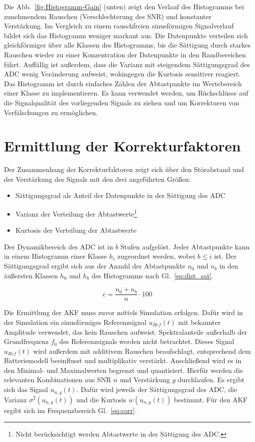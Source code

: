 Die Abb.~\ref{fig:Histogramm-Gain} (unten) zeigt den Verlauf des Histogramms bei zunehmendem Rauschen (Verschlechterung des SNR) und konstanter Verstärkung. Im Vergleich zu einem rauschfreien sinusförmigen Signalverlauf bildet sich das Histogramm weniger markant aus. Die Datenpunkte verteilen sich gleichförmiger über alle Klassen des Histogramms, bis die Sättigung durch starkes Rauschen wieder zu einer Konzentration der Datenpunkte in den Randbereichen führt. Auffällig ist außerdem, dass die Varianz mit steigendem Sättigungsgrad des ADC wenig Veränderung aufweist, wohingegen die Kurtosis sensitiver reagiert. Das Histogramm ist durch einfaches Zählen der Abtastpunkte im Wertebereich einer Klasse zu implementieren. Es kann verwendet werden, um Rückschlüsse auf die Signalqualität des vorliegenden Signals zu ziehen und um Korrekturen von Verfälschungen zu ermöglichen. 


\section{Ermittlung der Korrekturfaktoren}
Der Zusammenhang der Korrekturfaktoren zeigt sich über den Störabstand und der Verstärkung des Signals mit den drei angeführten Größen: 
\begin{itemize}
	\item Sättigungsgrad als Anteil der Datenpunkte in der Sättigung des ADC
	\item Varianz der Verteilung der Abtastwerte\footnote[1]{Nicht berücksichtigt werden Abtastwerte in der Sättigung des ADC.\label{foot:bereinigt}}
	\item Kurtosis der Verteilung der Abtastwerte
\end{itemize}
Der Dynamikbereich des ADC ist in $b$ Stufen aufgelöst. Jeder Abtastpunkte kann in einem Histogramm einer Klasse $h_i$ zugeordnet werden, wobei $b \leq i$ ist. Der Sättigungsgrad ergibt sich aus der Anzahl der Abtastpunkte $n_0$ und $n_b$ in den äußersten Klassen $h_0$ und $h_b$ des Histogramms nach Gl.~\eqref{eq:dist_sat}.

\begin{equation}
	\label{eq:dist_sat}
	c = \frac{n_0 + n_b}{n} \cdot 100
\end{equation}

Die Ermittlung der AKF muss zuvor mittels Simulation erfolgen. 
Dafür wird in der Simulation ein sinusförmiges Referenzsignal $u_{Ref}(t)$ mit bekannter Amplitude verwendet, das kein Rauschen aufweist. Spektralanteile außerhalb der Grundfrequenz $f_0$ des Referenzsignals werden nicht betrachtet. 
Dieses Signal $u_{Ref}(t)$ wird außerdem mit additivem Rauschen beaufschlagt, entsprechend dem Batteriemodell beeinflusst und multiplikativ verstärkt. Anschließend wird es in den Minimal- und Maximalwerten begrenzt und quantisiert. Hierfür werden die relevanten Kombinationen aus SNR $n$ und Verstärkung $g$ durchlaufen. Es ergibt sich das Signal $u_{n,g}(t)$. Dafür wird jeweils der Sättigungsgrad des ADC, die Varianz $\sigma^2(u_{n,g}(t))$ und die Kurtosis $w(u_{n,g}(t))$ bestimmt.
Für den AKF ergibt sich im Frequenzbereich Gl.~\eqref{eq:corr}.

